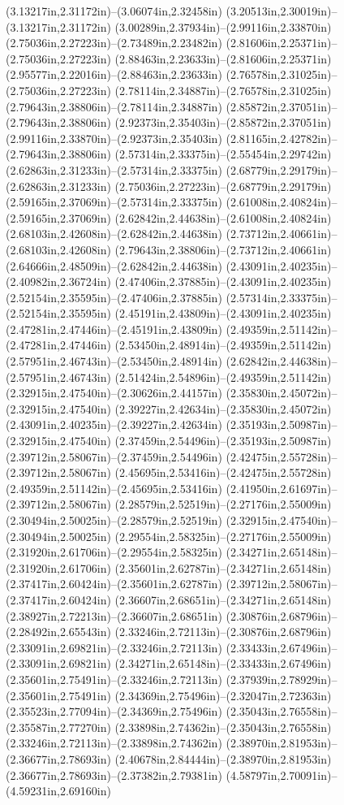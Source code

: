 (3.13217in,2.31172in)--(3.06074in,2.32458in) (3.20513in,2.30019in)--(3.13217in,2.31172in) (3.00289in,2.37934in)--(2.99116in,2.33870in) (2.75036in,2.27223in)--(2.73489in,2.23482in) (2.81606in,2.25371in)--(2.75036in,2.27223in) (2.88463in,2.23633in)--(2.81606in,2.25371in) (2.95577in,2.22016in)--(2.88463in,2.23633in) (2.76578in,2.31025in)--(2.75036in,2.27223in) (2.78114in,2.34887in)--(2.76578in,2.31025in) (2.79643in,2.38806in)--(2.78114in,2.34887in) (2.85872in,2.37051in)--(2.79643in,2.38806in) (2.92373in,2.35403in)--(2.85872in,2.37051in) (2.99116in,2.33870in)--(2.92373in,2.35403in) (2.81165in,2.42782in)--(2.79643in,2.38806in) (2.57314in,2.33375in)--(2.55454in,2.29742in) (2.62863in,2.31233in)--(2.57314in,2.33375in) (2.68779in,2.29179in)--(2.62863in,2.31233in) (2.75036in,2.27223in)--(2.68779in,2.29179in) (2.59165in,2.37069in)--(2.57314in,2.33375in) (2.61008in,2.40824in)--(2.59165in,2.37069in) (2.62842in,2.44638in)--(2.61008in,2.40824in) (2.68103in,2.42608in)--(2.62842in,2.44638in) (2.73712in,2.40661in)--(2.68103in,2.42608in) (2.79643in,2.38806in)--(2.73712in,2.40661in) (2.64666in,2.48509in)--(2.62842in,2.44638in) (2.43091in,2.40235in)--(2.40982in,2.36724in) (2.47406in,2.37885in)--(2.43091in,2.40235in) (2.52154in,2.35595in)--(2.47406in,2.37885in) (2.57314in,2.33375in)--(2.52154in,2.35595in) (2.45191in,2.43809in)--(2.43091in,2.40235in) (2.47281in,2.47446in)--(2.45191in,2.43809in) (2.49359in,2.51142in)--(2.47281in,2.47446in) (2.53450in,2.48914in)--(2.49359in,2.51142in) (2.57951in,2.46743in)--(2.53450in,2.48914in) (2.62842in,2.44638in)--(2.57951in,2.46743in) (2.51424in,2.54896in)--(2.49359in,2.51142in) (2.32915in,2.47540in)--(2.30626in,2.44157in) (2.35830in,2.45072in)--(2.32915in,2.47540in) (2.39227in,2.42634in)--(2.35830in,2.45072in) (2.43091in,2.40235in)--(2.39227in,2.42634in) (2.35193in,2.50987in)--(2.32915in,2.47540in) (2.37459in,2.54496in)--(2.35193in,2.50987in) (2.39712in,2.58067in)--(2.37459in,2.54496in) (2.42475in,2.55728in)--(2.39712in,2.58067in) (2.45695in,2.53416in)--(2.42475in,2.55728in) (2.49359in,2.51142in)--(2.45695in,2.53416in) (2.41950in,2.61697in)--(2.39712in,2.58067in) (2.28579in,2.52519in)--(2.27176in,2.55009in) (2.30494in,2.50025in)--(2.28579in,2.52519in) (2.32915in,2.47540in)--(2.30494in,2.50025in) (2.29554in,2.58325in)--(2.27176in,2.55009in) (2.31920in,2.61706in)--(2.29554in,2.58325in) (2.34271in,2.65148in)--(2.31920in,2.61706in) (2.35601in,2.62787in)--(2.34271in,2.65148in) (2.37417in,2.60424in)--(2.35601in,2.62787in) (2.39712in,2.58067in)--(2.37417in,2.60424in) (2.36607in,2.68651in)--(2.34271in,2.65148in) (2.38927in,2.72213in)--(2.36607in,2.68651in) (2.30876in,2.68796in)--(2.28492in,2.65543in) (2.33246in,2.72113in)--(2.30876in,2.68796in) (2.33091in,2.69821in)--(2.33246in,2.72113in) (2.33433in,2.67496in)--(2.33091in,2.69821in) (2.34271in,2.65148in)--(2.33433in,2.67496in) (2.35601in,2.75491in)--(2.33246in,2.72113in) (2.37939in,2.78929in)--(2.35601in,2.75491in) (2.34369in,2.75496in)--(2.32047in,2.72363in) (2.35523in,2.77094in)--(2.34369in,2.75496in) (2.35043in,2.76558in)--(2.35587in,2.77270in) (2.33898in,2.74362in)--(2.35043in,2.76558in) (2.33246in,2.72113in)--(2.33898in,2.74362in) (2.38970in,2.81953in)--(2.36677in,2.78693in) (2.40678in,2.84444in)--(2.38970in,2.81953in) (2.36677in,2.78693in)--(2.37382in,2.79381in) (4.58797in,2.70091in)--(4.59231in,2.69160in) 